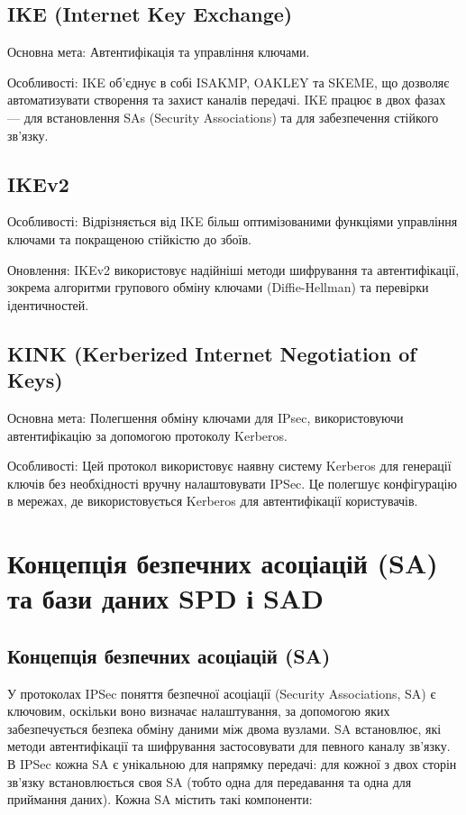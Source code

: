 \subsection{IKE (Internet Key Exchange)}
Основна мета: Автентифікація та управління ключами.
\par Особливості: IKE об’єднує в собі ISAKMP, OAKLEY та SKEME, що дозволяє автоматизувати створення та захист каналів передачі. IKE працює в двох фазах — для встановлення SAs (Security Associations) та для забезпечення стійкого зв’язку.

\subsection{IKEv2}
Особливості: Відрізняється від IKE більш оптимізованими функціями управління ключами та покращеною стійкістю до збоїв.
\par Оновлення: IKEv2 використовує надійніші методи шифрування та автентифікації, зокрема алгоритми групового обміну ключами (Diffie-Hellman) та перевірки ідентичностей.

\subsection{KINK (Kerberized Internet Negotiation of Keys)}
Основна мета: Полегшення обміну ключами для IPsec, використовуючи автентифікацію за допомогою протоколу Kerberos.
\par Особливості: Цей протокол використовує наявну систему Kerberos для генерації ключів без необхідності вручну налаштовувати IPSec. Це полегшує конфігурацію в мережах, де використовується Kerberos для автентифікації користувачів.

\section{Концепція безпечних асоціацій (SA) та бази даних SPD і SAD}

\subsection{Концепція безпечних асоціацій (SA)}

У протоколах IPSec поняття безпечної асоціації (Security Associations, SA) є ключовим, оскільки воно визначає налаштування, за допомогою яких забезпечується безпека обміну даними між двома вузлами. SA встановлює, які методи автентифікації та шифрування застосовувати для певного каналу зв’язку. В IPSec кожна SA є унікальною для напрямку передачі: для кожної з двох сторін зв'язку встановлюється своя SA (тобто одна для передавання та одна для приймання даних). Кожна SA містить такі компоненти:

